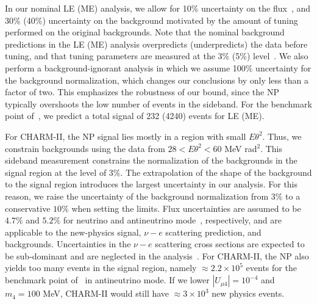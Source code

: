 In our nominal \minerva LE (ME) analysis, we allow for 10\% uncertainty on the flux~\cite{Aliaga:2016oaz}, and 30\% (40\%) uncertainty on the background motivated by the amount of tuning performed on the original backgrounds. Note that the nominal background predictions in the \minerva LE (ME) analysis overpredicts (underpredicts) the data before tuning, and that tuning parameters are measured at the 3\% (5\%) level~\cite{Park:2013dax,Valencia:2019mkf}.
We also perform a background-ignorant analysis in which we assume 100\% uncertainty for the background normalization, which changes our conclusions by only less than a factor of two. This emphasizes the robustness of our \minerva bound, since the NP typically overshoots the low number of events in the sideband. For the benchmark point of~\cite{Bertuzzo:2018itn}, we predict a total signal of 232 (4240) events for \minerva LE (ME).

For CHARM-II, the NP signal lies mostly in a region with small $E\theta^2$. Thus, we constrain backgrounds using the data from $28 < E\theta^2 < 60$ MeV rad$^2$. This sideband measurement constrains the normalization of the backgrounds in the signal region at the level of $3\%$.
The extrapolation of the shape of the background to the signal region introduces the largest uncertainty in our analysis. For this reason, we raise the uncertainty of the background normalization from $3\%$ to a conservative $10 \%$ when setting the limits. Flux uncertainties are assumed to be $4.7\%$ and $5.2\%$ for neutrino and antineutrino mode~\cite{Allaby:1987bb}, respectively, and are applicable to the new-physics signal, $\nu-e$ scattering prediction, and backgrounds. 
Uncertainties in the $\nu-e$ scattering cross sections are expected to be sub-dominant and are neglected in the analysis~\cite{deGouvea:2006hfo}. For CHARM-II, the NP also yields too many events in the signal region, namely $\approx 2.2\times10^{5}$ events for the benchmark point of~\cite{Bertuzzo:2018itn} in antineutrino mode. If we lower $|U_{\mu4}| = 10^{-4}$ and $m_4 = 100$ MeV, CHARM-II would still have $\approx 3 \times 10^3$ new physics events. 

